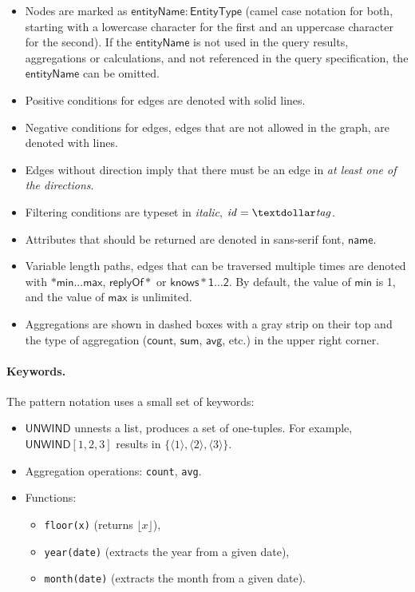 \begin{itemize}
	\item Nodes are marked as $\mathsf{entityName: EntityType}$ (camel case 
	notation for both, starting with a lowercase character for the first and an 
	uppercase character for the second). If the $\mathsf{entityName}$ is not used 
	in the query results, aggregations or calculations, and not referenced in the 
	query specification, the $\mathsf{entityName}$ can be omitted.
	\item Positive conditions for edges are denoted with solid lines.
	\item Negative conditions for edges, \ie edges that are not allowed in the graph, are denoted with \textcolor{red}{} lines.
	\item Edges without direction imply that there must be an edge in \emph{at least one of the directions}.
	\item Filtering conditions are typeset in \textit{italic}, \eg $\mathit{id} = 
	\mathit{\textdollar tag}$.
	\item Attributes that should be returned are denoted in sans-serif font, \eg $\mathsf{name}$.
	\item Variable length paths, \ie edges that can be traversed multiple times 
	are denoted with $*\mathsf{min}...\mathsf{max}$, \eg $\mathsf{replyOf}*$ or 
	$\mathsf{knows*1 \ldots 2}$. By default, the value of $\mathsf{min}$ is 1, 
	and the value of $\mathsf{max}$ is unlimited.
	\item Aggregations are shown in dashed boxes with a gray strip on their top and the type of aggregation ($\mathsf{count}$, $\mathsf{sum}$, $\mathsf{avg}$, etc.) in the upper right corner.
\end{itemize}

\newcommand{\tuple}[1]{\langle #1 \rangle}

\paragraph{Keywords.} The pattern notation uses a small set of keywords:

\begin{itemize}
	\item $\mathsf{UNWIND}$ unnests a list, \ie produces a set of one-tuples. For 
	example, $\mathsf{UNWIND} [1, 2, 3]$ results in $ \{ \tuple{1}, \tuple{2}, 
	\tuple{3} \} $.
	\item Aggregation operations: \lstinline{count}, \lstinline{avg}. %
	\item Functions:
	\begin{itemize}
		\item \lstinline{floor(x)} (returns $\lfloor x \rfloor$),
		\item \lstinline{year(date)} (extracts the year from a given date),
		\item \lstinline{month(date)} (extracts the month from a given date).
	\end{itemize}
\end{itemize}

